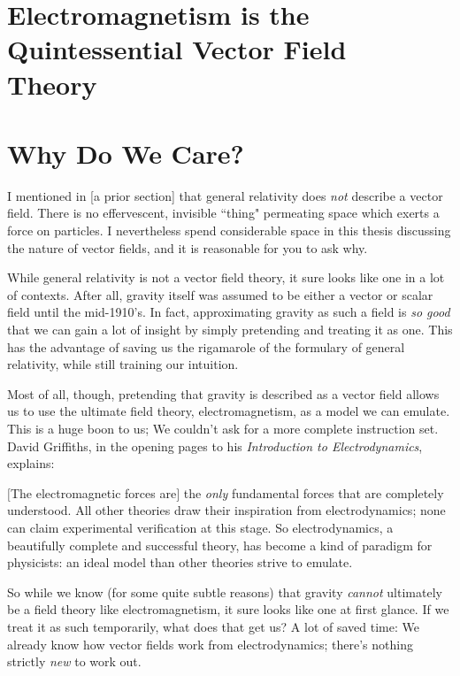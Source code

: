 \documentclass[11pt]{article}
\begin{document}
\section{Electromagnetism is the Quintessential Vector Field\\Theory}



\section{Why Do We Care?}
I mentioned in [a prior section] that general relativity does \emph{not} describe a vector field.  There is no effervescent, invisible ``thing" permeating space which exerts a force on particles.  I nevertheless spend considerable space in this thesis discussing the nature of vector fields, and it is reasonable for you to ask why.

While general relativity is not a vector field theory, it sure looks like one in a lot of contexts.  After all, gravity itself was assumed to be either a vector or scalar field until the mid-1910's.  In fact, approximating gravity as such a field is \emph{so good} that we can gain a lot of insight by simply pretending and treating it as one.  This has the advantage of saving us the rigamarole of the formulary of general relativity, while still training our intuition.

Most of all, though, pretending that gravity is described as a vector field allows us to use the ultimate field theory, electromagnetism, as a model we can emulate.  This is a huge boon to us; We couldn't ask for a more complete instruction set.  David Griffiths, in the opening pages to his \emph{Introduction to Electrodynamics}, explains:
  
\begin{displayquote}
$[$The electromagnetic forces are$]$ the \emph{only} fundamental forces that are completely understood.  All other theories draw their inspiration from electrodynamics; none can claim experimental verification at this stage.  So electrodynamics, a beautifully complete and successful theory, has become a kind of paradigm for physicists: an ideal model than other theories strive to emulate.
\end{displayquote}

So while we know (for some quite subtle reasons) that gravity \emph{cannot} ultimately be a field theory like electromagnetism, it sure looks like one at first glance.  If we treat it as such temporarily, what does that get us?  A lot of saved time:  We already know how vector fields work from electrodynamics; there's nothing strictly \emph{new} to work out.
\end{document}
